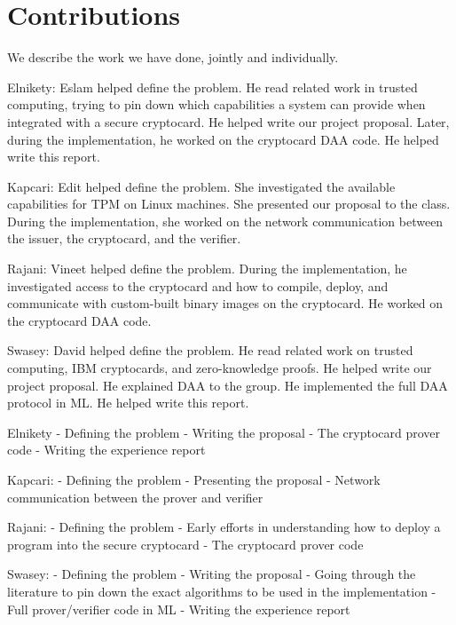 \section{Contributions}

We describe the work we have done, jointly and individually.

Elnikety: Eslam helped define the problem. He read related work in trusted
computing, trying to pin down which capabilities a system can provide when
integrated with a secure cryptocard. He helped write our project proposal.
Later, during the implementation, he worked on the cryptocard DAA
code. He helped write this report.

Kapcari: Edit helped define the problem. She investigated the available
capabilities for TPM on Linux machines. She presented our proposal to the class.
During the implementation, she worked on the network communication between
the issuer, the cryptocard, and the verifier.

Rajani: Vineet helped define the problem. During the implementation, he investigated access to
the cryptocard and how to compile, deploy, and communicate with
custom-built binary images on the cryptocard. He worked
on the cryptocard DAA code.

Swasey: David helped define the problem. He read related work on
trusted computing, IBM cryptocards, and zero-knowledge proofs. He helped write our project proposal.
He explained DAA to the group.
He implemented the full DAA protocol in ML.
He helped write this report.


\begin{comment}
	\emph{EE:} Aniket’s Summary of Contributions (no hosing)
\end{comment}

Elnikety
- Defining the problem
- Writing the proposal
- The cryptocard prover code
- Writing the experience report

Kapcari:
- Defining the problem
- Presenting the proposal
- Network communication between the prover and verifier

Rajani:
- Defining the problem
- Early efforts in understanding how to deploy a program into the secure
cryptocard
- The cryptocard prover code 

Swasey:
- Defining the problem
- Writing the proposal
- Going through the literature to pin down the exact algorithms to be used in
the implementation
- Full prover/verifier code in ML
- Writing the experience report

\fi